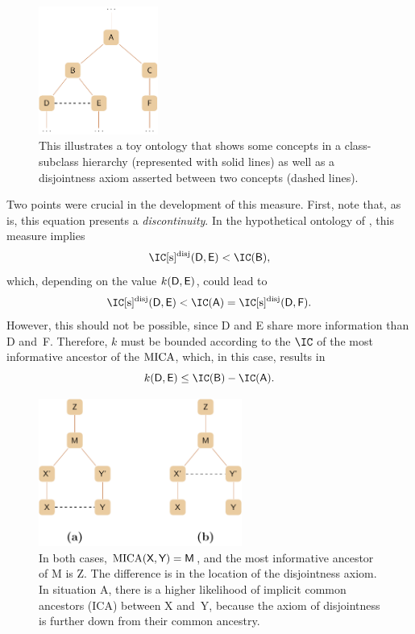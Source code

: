 \begin{figure}
    \centering
    \includegraphics[width=0.35\textwidth]{images/toy-disjoints.pdf}
    \caption[Example ontology with disjointness axioms]{This illustrates a toy ontology that shows some concepts in a class-subclass hierarchy (represented with solid lines) as well as a disjointness axiom asserted between two concepts (dashed lines).}
    \label{fig:toy}
\end{figure}

Two points were crucial in the development of this measure. First, note that, as is, this equation presents a \emph{discontinuity}. In the hypothetical ontology of , this measure implies
\begin{equation}
    \ICsdis(\term D, \term E) < \IC(\term B),
\end{equation}
which, depending on the value $k(\protect\textsf D, \protect\textsf E)$, could lead to
\begin{equation}
    \ICsdis(\term D, \term E) < \IC(\term A) = \ICsdis(\term D, \term F).
\end{equation}
However, this should not be possible, since \term D and \term E share more information than \term D and~\term F. Therefore, $k$ must be bounded according to the $\IC$ of the most informative ancestor of the $\operatorname{MICA}$, which, in this case, results in
\begin{equation}
    k(\term D, \term E) \leq \IC(\term B) - \IC(\term A).
\end{equation}

\begin{figure}
    \centering
    \includegraphics[width=0.594\textwidth]{images/strength.pdf}
    \caption[The potential for implicit common superclasses between two concepts]{In both cases, $\operatorname{MICA}(\protect\textsf X, \protect\textsf Y) = \protect\textsf M$, and the most informative ancestor of \term M is \term Z. The difference is in the location of the disjointness axiom. In situation A, there is a higher likelihood of implicit common ancestors (ICA) between \term X and~\term Y, because the axiom of disjointness is further down from their common ancestry.}
    \label{fig:strength}
\end{figure}

